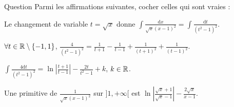 \begin{multi}[multiple,feedback=
{Avec \(\displaystyle t=\sqrt{x}\), on a : \(\displaystyle x=t^2\Rightarrow \mathrm{d}x=2t\, \mathrm{d}t\) et \(\displaystyle \int \frac{\mathrm{d}x}{\sqrt{x}(x-1)^2}=\int \frac{2\, \mathrm{d}t}{(t^2-1)^2}\). La décomposition en éléments simples donne : \(\displaystyle \frac{4}{(t^2-1)^2}=\frac{1}{t+1}-\frac{1}{t-1}+\frac{1}{(t+1)^2}+\frac{1}{(t-1)^2}\). Donc
\[\int \frac{4\mathrm{d}t}{(t^2-1)^2}=\ln \left|\frac{t+1}{t-1}\right|-\frac{2t}{t^2-1}+k,\; k\in \Rr.\]
D'où
\[\int \frac{\mathrm{d}x}{\sqrt{x}(x-1)^2}=\frac{1}{2}\left(\ln \left|\frac{t+1}{t-1}\right|-\frac{2t}{t^2-1}\right)+k=\frac{1}{2}\left(\ln \left|\frac{\sqrt{x}+1}{\sqrt{x}-1}\right|-\frac{2\sqrt{x}}{x-1}\right)+k,\; k\in \Rr.\]
}]{Question}
Parmi les affirmations suivantes, cocher celles qui sont vraies :

    \item Le changement de variable \(\displaystyle t=\sqrt{x}\) donne \(\displaystyle \int \frac{\mathrm{d}x}{\sqrt{x}(x-1)^2}=\int \frac{\mathrm{d}t}{(t^2-1)^2}\).
    \item* \(\forall t\in \mathbb{R}\setminus \{-1,1\}\), \(\displaystyle \frac{4}{(t^2-1)^2}=\frac{1}{t+1}-\frac{1}{t-1}+\frac{1}{(t+1)^2}+\frac{1}{(t-1)^2}\).
    \item* \(\displaystyle \int \frac{4\mathrm{d}t}{(t^2-1)^2}=\ln \left|\frac{t+1}{t-1}\right|-\frac{2t}{t^2-1}+k\), \(k\in \mathbb{R}\).
    \item Une primitive de \(\displaystyle \frac{1}{\sqrt{x}(x-1)^2}\) sur \(]1,+\infty[\) est \(\displaystyle \ln \left|\frac{\sqrt{x}+1}{\sqrt{x}-1}\right|-\frac{2\sqrt{x}}{x-1}\).
\end{multi}


